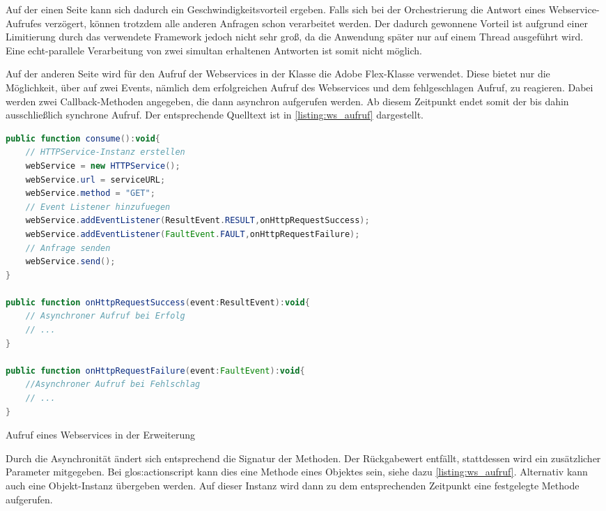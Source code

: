 \begin{onehalfspacing}
Auf der einen Seite kann sich dadurch ein Geschwindigkeitsvorteil ergeben. Falls sich bei der Orchestrierung die Antwort eines Webservice-Aufrufes verzögert, können trotzdem alle anderen Anfragen schon verarbeitet werden. Der dadurch gewonnene Vorteil ist aufgrund einer Limitierung durch das verwendete Framework jedoch nicht sehr groß, da die Anwendung später nur auf einem Thread ausgeführt wird. Eine echt-parallele Verarbeitung von zwei simultan erhaltenen Antworten ist somit nicht möglich.

Auf der anderen Seite wird für den Aufruf der Webservices in der Klasse  die Adobe Flex-Klasse  verwendet. Diese bietet nur die Möglichkeit, über  auf zwei Events, nämlich dem erfolgreichen Aufruf des Webservices und dem fehlgeschlagen Aufruf, zu reagieren. Dabei werden zwei Callback-Methoden angegeben, die dann asynchron aufgerufen werden. Ab diesem Zeitpunkt endet somit der bis dahin ausschließlich synchrone Aufruf. Der entsprechende Quelltext ist in \vref{listing:ws_aufruf} dargestellt.

\begin{programm}[ht]
\begin{lstlisting}[language=ActionScript]
public function consume():void{
	// HTTPService-Instanz erstellen
	webService = new HTTPService();
	webService.url = serviceURL;     
	webService.method = "GET";
	// Event Listener hinzufuegen
	webService.addEventListener(ResultEvent.RESULT,onHttpRequestSuccess);
	webService.addEventListener(FaultEvent.FAULT,onHttpRequestFailure);
	// Anfrage senden
	webService.send();
}
		
public function onHttpRequestSuccess(event:ResultEvent):void{
	// Asynchroner Aufruf bei Erfolg
	// ...
}
		
public function onHttpRequestFailure(event:FaultEvent):void{
	//Asynchroner Aufruf bei Fehlschlag
	// ...
}
\end{lstlisting}
\caption{Aufruf eines Webservices in der Erweiterung\label{listing:ws_aufruf}}
\end{programm}

Durch die Asynchronität ändert sich entsprechend die Signatur der Methoden. Der Rückgabewert entfällt, stattdessen wird ein zusätzlicher Parameter mitgegeben. Bei \gls{glos:actionscript} kann dies eine Methode eines Objektes sein, siehe dazu \vref{listing:ws_aufruf}. Alternativ kann auch eine Objekt-Instanz übergeben werden. Auf dieser Instanz wird dann zu dem entsprechenden Zeitpunkt eine festgelegte Methode aufgerufen.


\end{onehalfspacing}
